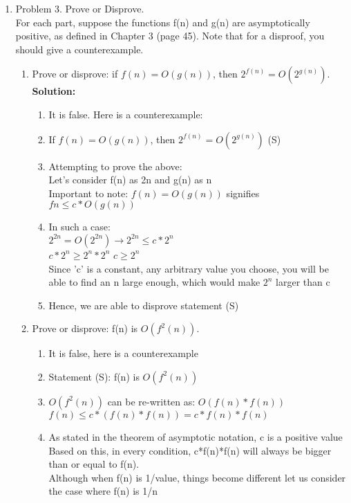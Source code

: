 \documentclass[11pt]{article}
\begin{document}
\begin{enumerate}
\item Problem 3. Prove or Disprove.\\
For each part, suppose the functions f(n) and g(n) are asymptotically positive, as defined in Chapter 3 (page 45). Note that for a disproof, you should give a counterexample.
    \begin{enumerate}
        \item Prove or disprove: if $f(n)=O(g(n))$, then $2^{f(n)}=O(2^{g(n)})$.
        \textbf{Solution:}
        \begin{enumerate}
            \item It is false. Here is a counterexample:
            \item If $f(n)=O(g(n))$, then $2^{f(n)}=O(2^{g(n)})$ \hspace{1cm} (S)
            \item Attempting to prove the above:\\
            Let's consider f(n) as 2n and g(n) as n\\
            Important to note: $f(n)=O(g(n))$ signifies $fn \leq c * O(g(n))$
            \item In such a case:\\
            $2^{2n} = O(2^{2n}) \rightarrow 2^{2n} \leq c * 2^n$\\
            $c*2^n \geq 2^n * 2^n$ \rightarrow $c \geq 2^n$\\
            Since 'c' is a constant, any arbitrary value you choose, you will be able to find an n large enough, which would make $2^n$ larger than c
            \item Hence, we are able to disprove statement (S)
        \end{enumerate}
        
        \item Prove or disprove: f(n) is $O(f^2(n))$.

        \begin{enumerate}
            \item It is false, here is a counterexample
            \item Statement (S): f(n) is $O(f^2(n))$
            \item $O(f^2(n))$ can be re-written as: $O(f(n) * f(n))$\\
            $f(n) \leq c * (f(n) * f(n)) = c * f(n) *f(n)$
            \item As stated in the theorem of asymptotic notation, c is a positive value\\
            Based on this, in every condition, c*f(n)*f(n) will always be bigger than or equal to f(n).\\
            Although when f(n) is 1/value, things become different let us consider the case where f(n) is 1/n
            

\end{enumerate}
\end{enumerate}
\end{enumerate}
\end{document}

